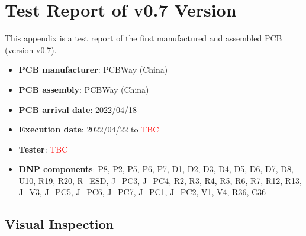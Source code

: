 %
%
%
%
%

%
%
%
%
%

\chapter{Test Report of v0.7 Version} \label{anx:test-report-v07}

This appendix is a test report of the first manufactured and assembled PCB (version v0.7).

\begin{itemize}
    \item \textbf{PCB manufacturer}: PCBWay (China)
    \item \textbf{PCB assembly}: PCBWay (China)
    \item \textbf{PCB arrival date}: 2022/04/18
    \item \textbf{Execution date}: 2022/04/22 to \textcolor{red}{TBC}
    \item \textbf{Tester}: \textcolor{red}{TBC}
    \item \textbf{DNP components}: P8, P2, P5, P6, P7, D1, D2, D3, D4, D5, D6, D7, D8, U10, R19, R20, R\_ESD, J\_PC3, J\_PC4, R2, R3, R4, R5, R6, R7, R12, R13, J\_V3, J\_PC5, J\_PC6, J\_PC7, J\_PC1, J\_PC2, V1, V4, R36, C36
\end{itemize}

\section{Visual Inspection}


